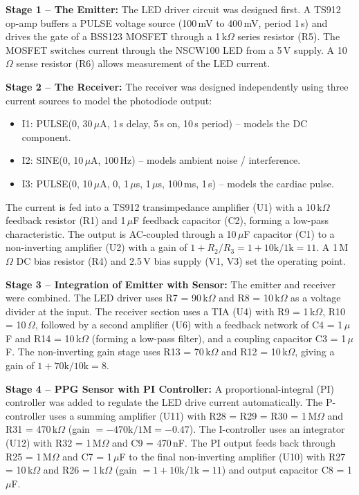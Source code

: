 \documentclass[10pt]{article}
\begin{document}
\textbf{Stage 1 -- The Emitter:} The LED driver circuit was designed first. A TS912 op-amp buffers a PULSE voltage source (100\,mV to 400\,mV, period 1\,s) and drives the gate of a BSS123 MOSFET through a 1\,k$\Omega$ series resistor (R5). The MOSFET switches current through the NSCW100 LED from a 5\,V supply. A 10\,$\Omega$ sense resistor (R6) allows measurement of the LED current.

\textbf{Stage 2 -- The Receiver:} The receiver was designed independently using three current sources to model the photodiode output:
\begin{itemize}
    \item I1: PULSE(0, 30\,$\mu$A, 1\,s delay, 5\,s on, 10\,s period) -- models the DC component.
    \item I2: SINE(0, 10\,$\mu$A, 100\,Hz) -- models ambient noise / interference.
    \item I3: PULSE(0, 10\,$\mu$A, 0, 1\,$\mu$s, 1\,$\mu$s, 100\,ms, 1\,s) -- models the cardiac pulse.
\end{itemize}
The current is fed into a TS912 transimpedance amplifier (U1) with a 10\,k$\Omega$ feedback resistor (R1) and 1\,$\mu$F feedback capacitor (C2), forming a low-pass characteristic. The output is AC-coupled through a 10\,$\mu$F capacitor (C1) to a non-inverting amplifier (U2) with a gain of $1 + R_2/R_3 = 1 + 10\mathrm{k}/1\mathrm{k} = 11$. A 1\,M$\Omega$ DC bias resistor (R4) and 2.5\,V bias supply (V1, V3) set the operating point.

\textbf{Stage 3 -- Integration of Emitter with Sensor:} The emitter and receiver were combined. The LED driver uses R7 = 90\,k$\Omega$ and R8 = 10\,k$\Omega$ as a voltage divider at the input. The receiver section uses a TIA (U4) with R9 = 1\,k$\Omega$, R10 = 10\,$\Omega$, followed by a second amplifier (U6) with a feedback network of C4 = 1\,$\mu$F and R14 = 10\,k$\Omega$ (forming a low-pass filter), and a coupling capacitor C3 = 1\,$\mu$F. The non-inverting gain stage uses R13 = 70\,k$\Omega$ and R12 = 10\,k$\Omega$, giving a gain of $1 + 70\mathrm{k}/10\mathrm{k} = 8$.

\textbf{Stage 4 -- PPG Sensor with PI Controller:} A proportional-integral (PI) controller was added to regulate the LED drive current automatically. The P-controller uses a summing amplifier (U11) with R28 = R29 = R30 = 1\,M$\Omega$ and R31 = 470\,k$\Omega$ (gain $= -470\mathrm{k}/1\mathrm{M} = -0.47$). The I-controller uses an integrator (U12) with R32 = 1\,M$\Omega$ and C9 = 470\,nF. The PI output feeds back through R25 = 1\,M$\Omega$ and C7 = 1\,$\mu$F to the final non-inverting amplifier (U10) with R27 = 10\,k$\Omega$ and R26 = 1\,k$\Omega$ (gain $= 1 + 10\mathrm{k}/1\mathrm{k} = 11$) and output capacitor C8 = 1\,$\mu$F.
\end{document}
